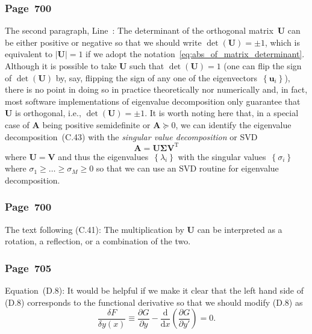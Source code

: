 \documentclass[12pt,a4paper]{article}
\newcommand{\erratum}[1]{\subsubsection*{#1}}
\begin{document}
\erratum{Page~700}
The second paragraph, Line~:
The determinant of the orthogonal matrix~$\mathbf{U}$ can be either positive or negative so that
we should write $\operatorname{det}(\mathbf{U}) = \pm 1$, which is equivalent to
$\left|\mathbf{U}\right| = 1$ if we adopt the notation~\eqref{eq:abs_of_matrix_determinant}.
Although it is possible to take $\mathbf{U}$ such that $\operatorname{det}(\mathbf{U}) = 1$
(one can flip the sign of $\operatorname{det}(\mathbf{U})$ by, say, flipping the sign of
any one of the eigenvectors~$\left\{\mathbf{u}_i\right\}$),
there is no point in doing so in practice theoretically nor numerically and, in fact,
most software implementations of eigenvalue decomposition only guarantee that $\mathbf{U}$ is
orthogonal, i.e., $\operatorname{det}(\mathbf{U}) = \pm 1$.
It is worth noting here that,
in a special case of $\mathbf{A}$ being positive semidefinite or $\mathbf{A} \succeq 0$,
we can identify the eigenvalue decomposition~(C.43) with
the \emph{singular value decomposition} or SVD~\citep{Press:NR,GvL:MC}
\begin{equation}
\mathbf{A} = \mathbf{U}\bm{\Sigma}\mathbf{V}^{\operatorname{T}}
\end{equation}
where $\mathbf{U} = \mathbf{V}$ and thus
the eigenvalues~$\left\{\lambda_i\right\}$ with the singular values~$\left\{\sigma_i\right\}$
where $\sigma_1 \geqslant \dots \geqslant \sigma_M \geqslant 0$
so that we can use an SVD routine for eigenvalue decomposition.

\erratum{Page~700}
The text following (C.41):
The multiplication by $\mathbf{U}$ can be interpreted as a rotation, a reflection,
or a combination of the two.

\erratum{Page~705}
Equation~(D.8):
It would be helpful if we make it clear that the left hand side of (D.8) corresponds to
the functional derivative so that we should modify (D.8) as
\begin{equation}
\frac{\delta F}{\delta y(x)} \equiv
\frac{\partial G}{\partial y} -
\frac{\mathrm{d}}{\mathrm{d}x} \left( \frac{\partial G}{\partial y'} \right) = 0 .
\label{eq:euler_lagrange_equation_D_8}
\end{equation}
\end{document}
